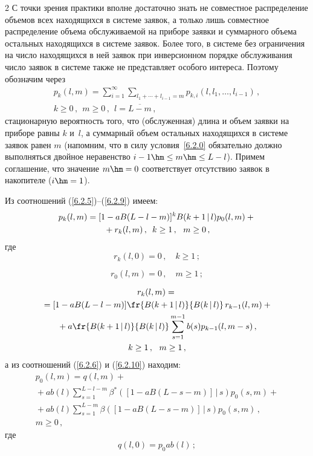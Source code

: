 \begin{multicols}{2}
С точки зрения практики вполне достаточно знать не
совместное распределение объемов всех находящихся в
системе заявок, а только лишь совместное распределение
объема обслуживаемой на приборе заявки и суммарного
объема остальных находящихся в сис\-те\-ме заявок.
Более того, в сис\-те\-ме без ограничения на чис\-ло
находящихся в ней заявок при инверсионном порядке
обслуживания чис\-ло
заявок в сис\-те\-ме также не представляет особого интереса.
Поэтому обозначим через
\begin{multline*}
p_{k}(l,m)
= \sum\limits_{i=1}^\infty
\sum\limits_{l_1+\cdots+l_{i-1}=m}
p_{k,i}(l,l_1,\ldots,l_{i-1})\,,
\\
 k\ge 0\,,\ \ m\ge 0\,,\ \ l=\overline{L-m}\,,
\end{multline*}
стационарную вероятность того, что (обслуженная) длина
и объем заявки на приборе равны $k$ и~$l$, а суммарный
объем остальных находящихся в сис\-те\-ме заявок равен $m$
(напомним, что в силу условия~\eqref{6.2.0} обязательно
должно выполняться двойное неравенство
$i-1\hm\le m \hm\le L-l$).
Примем соглашение, что значение $m\hm=0$ соответствует
отсутствию заявок в накопителе ($i\hm=1$).

Из соотношений (\ref{6.2.5})--(\ref{6.2.9}) имеем:
\begin{multline}
\label{6.2*.11}
p_{k}(l,m)
=[1 - a B(L-l-m)]^k
B(k+1\,\vert\,l) p_{0}(l,m)
+{}\\
{}+ r_{k}(l,m)\,,
\enskip
k \ge 1\,,\ \ m\ge 0\,,
\end{multline}
где
\begin{equation}
\label{6.2*.12}
r_{k}(l,0) = 0\,, \quad k \ge 1\,;
\end{equation}

\noindent
\begin{equation}
\label{6.2*.13}
r_{0}(l,m) = 0\,,
\quad m \ge 1\,;
\end{equation}

\vspace*{-9pt}

\noindent
\begin{multline}
r_{k}(l,m) ={}\\
{}=
[1 - a B(L-l-m)]
\fr{B(k+1\,|\,l)}{ B(k\,|\,l)}
\,r_{k-1}(l,m) +{}\\
{}+ a \fr{B(k+1\,|\,l) }{ B(k\,|\,l)}
\sum\limits_{s=1}^{m-1}
b(s) p_{k-1}(l,m-s)\,,
\\
 k\ge 1\,,
\ \ m \ge 1\,,
\label{6.2*.14}
\end{multline}
а из соотношений (\ref{6.2.6}) и (\ref{6.2.10}) находим:
\begin{multline}
p_{0}(l,m) =q(l,m) + {}\\
{}+ a b(l)
\sum\limits_{s=1}^{L-l-m}
\beta^*([1 - a B(L-s-m)]\,|\,s)
p_{0}(s,m)
 +{}
\\
{}+ a b(l) \sum\limits_{s=1}^{L-m}
\beta([1 - a B(L-s-m)]\,|\,s)
p_{0}(s,m)\,,
\\
m \ge 0\,,
\label{6.2*.15}
\end{multline}
где
\begin{equation}
\label{6.2*.16}
q(l,0) = p_0 a b(l) \,;
\end{equation}


\end{multicols}
